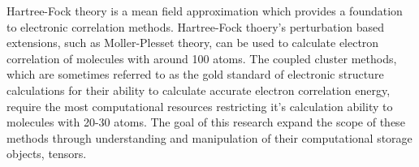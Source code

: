 Hartree-Fock theory is a mean field approximation which provides a foundation to electronic correlation methods. Hartree-Fock thoery's perturbation based extensions, such as M{\/o}ller-Plesset theory, can be used to calculate electron correlation of molecules with around 100 atoms.  The coupled cluster methods, which are sometimes referred to as the gold standard of electronic structure calculations for their ability to calculate accurate electron correlation energy, require the most computational resources restricting it's calculation ability to molecules with 20-30 atoms. The goal of this research expand the scope of these methods through understanding and manipulation of their computational storage objects, tensors.   %

